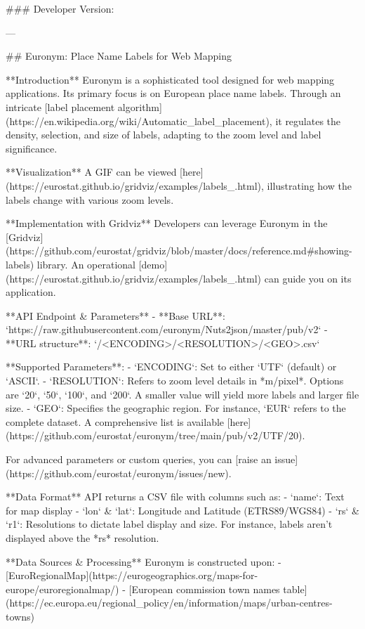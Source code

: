 ### Developer Version:

---

## Euronym: Place Name Labels for Web Mapping

**Introduction**  
Euronym is a sophisticated tool designed for web mapping applications. Its primary focus is on European place name labels. Through an intricate [label placement algorithm](https://en.wikipedia.org/wiki/Automatic_label_placement), it regulates the density, selection, and size of labels, adapting to the zoom level and label significance.

**Visualization**  
A GIF can be viewed [here](https://eurostat.github.io/gridviz/examples/labels_.html), illustrating how the labels change with various zoom levels.

**Implementation with Gridviz**  
Developers can leverage Euronym in the [Gridviz](https://github.com/eurostat/gridviz/blob/master/docs/reference.md#showing-labels) library. An operational [demo](https://eurostat.github.io/gridviz/examples/labels_.html) can guide you on its application.

**API Endpoint & Parameters**  
- **Base URL**: `https://raw.githubusercontent.com/euronym/Nuts2json/master/pub/v2`
- **URL structure**: `/<ENCODING>/<RESOLUTION>/<GEO>.csv`
  
**Supported Parameters**:
- `ENCODING`: Set to either `UTF` (default) or `ASCII`.
- `RESOLUTION`: Refers to zoom level details in *m/pixel*. Options are `20`, `50`, `100`, and `200`. A smaller value will yield more labels and larger file size.
- `GEO`: Specifies the geographic region. For instance, `EUR` refers to the complete dataset. A comprehensive list is available [here](https://github.com/eurostat/euronym/tree/main/pub/v2/UTF/20).

For advanced parameters or custom queries, you can [raise an issue](https://github.com/eurostat/euronym/issues/new).

**Data Format**  
API returns a CSV file with columns such as:
- `name`: Text for map display
- `lon` & `lat`: Longitude and Latitude (ETRS89/WGS84)
- `rs` & `r1`: Resolutions to dictate label display and size. For instance, labels aren't displayed above the *rs* resolution.
  
**Data Sources & Processing**  
Euronym is constructed upon:
- [EuroRegionalMap](https://eurogeographics.org/maps-for-europe/euroregionalmap/)
- [European commission town names table](https://ec.europa.eu/regional_policy/en/information/maps/urban-centres-towns)

